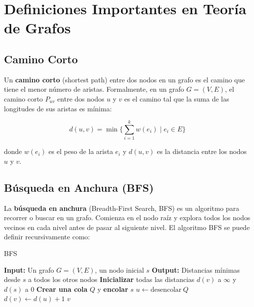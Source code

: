 \section{Definiciones Importantes en Teoría de Grafos}

\subsection{Camino Corto}

Un \textbf{camino corto} (shortest path) entre dos nodos en un grafo es el camino que tiene el menor número de aristas. Formalmente, en un grafo \( G = (V, E) \), el camino corto \( P_{uv} \) entre dos nodos \( u \) y \( v \) es el camino tal que la suma de las longitudes de sus aristas es mínima:

\[
d(u,v) = \min \{ \sum_{i=1}^{k} w(e_i) \mid e_i \in E \}
\]

donde \( w(e_i) \) es el peso de la arista \( e_i \) y \( d(u,v) \) es la distancia entre los nodos \( u \) y \( v \).

\subsection{Búsqueda en Anchura (BFS)}

La \textbf{búsqueda en anchura} (Breadth-First Search, BFS) es un algoritmo para recorrer o buscar en un grafo. Comienza en el nodo raíz y explora todos los nodos vecinos en cada nivel antes de pasar al siguiente nivel. El algoritmo BFS se puede definir recursivamente como:

\begin{algorithm}
\caption{BFS}
\begin{algorithmic}[1]
    \State \textbf{Input:} Un grafo \( G = (V, E) \), un nodo inicial \( s \)
    \State \textbf{Output:} Distancias mínimas desde \( s \) a todos los otros nodos
    \State \textbf{Inicializar} todas las distancias \( d(v) \) a \(\infty\) y \( d(s) \) a 0
    \State \textbf{Crear una cola} \( Q \) y \textbf{encolar} \( s \)
        \State \( u \gets \text{desencolar} \ Q \)
                \State \( d(v) \gets d(u) + 1 \)
                \State {} \( v \)
            \EndIf
        \EndFor
    \EndWhile
\EndProcedure
\end{algorithmic}
\end{algorithm}

